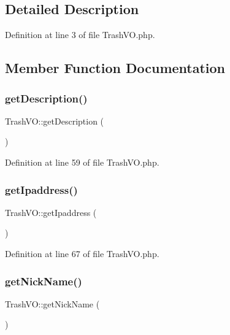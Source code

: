 \subsection{Detailed Description}


Definition at line 3 of file Trash\+V\+O.\+php.



\subsection{Member Function Documentation}
\hypertarget{classTrashVO_a6b1202c6bed558f3775f8b7a1d9e6a03}{}\label{classTrashVO_a6b1202c6bed558f3775f8b7a1d9e6a03} 
\subsubsection{\texorpdfstring{get\+Description()}{getDescription()}}
{\footnotesize\ttfamily Trash\+V\+O\+::get\+Description (\begin{DoxyParamCaption}{ }\end{DoxyParamCaption})}



Definition at line 59 of file Trash\+V\+O.\+php.

\hypertarget{classTrashVO_ae5c46d914e022d5fe7d4dde9b6d4f7b1}{}\label{classTrashVO_ae5c46d914e022d5fe7d4dde9b6d4f7b1} 
\subsubsection{\texorpdfstring{get\+Ipaddress()}{getIpaddress()}}
{\footnotesize\ttfamily Trash\+V\+O\+::get\+Ipaddress (\begin{DoxyParamCaption}{ }\end{DoxyParamCaption})}



Definition at line 67 of file Trash\+V\+O.\+php.

\hypertarget{classTrashVO_aba10424cba71a92cca060b6683f4f3af}{}\label{classTrashVO_aba10424cba71a92cca060b6683f4f3af} 
\subsubsection{\texorpdfstring{get\+Nick\+Name()}{getNickName()}}
{\footnotesize\ttfamily Trash\+V\+O\+::get\+Nick\+Name (\begin{DoxyParamCaption}{ }\end{DoxyParamCaption})}



